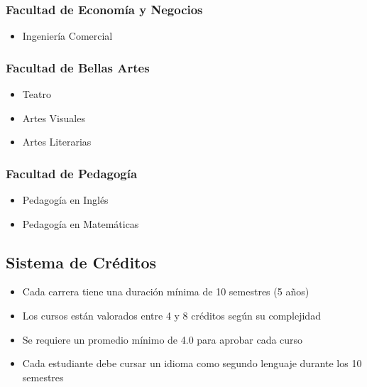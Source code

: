 \documentclass[12pt,a4paper]{article}
\begin{document}
	\subsubsection{Facultad de Economía y Negocios}
	\begin{itemize}
		\item Ingeniería Comercial
	\end{itemize}
	
	\subsubsection{Facultad de Bellas Artes}
	\begin{itemize}
		\item Teatro
		\item Artes Visuales
		\item Artes Literarias
	\end{itemize}
	
	\subsubsection{Facultad de Pedagogía}
	\begin{itemize}
		\item Pedagogía en Inglés
		\item Pedagogía en Matemáticas
	\end{itemize}
	
	\subsection{Sistema de Créditos}
	\begin{itemize}
		\item Cada carrera tiene una duración mínima de 10 semestres (5 años)
		\item Los cursos están valorados entre 4 y 8 créditos según su complejidad
		\item Se requiere un promedio mínimo de 4.0 para aprobar cada curso
		\item Cada estudiante debe cursar un idioma como segundo lenguaje durante los 10 semestres
	\end{itemize}
	
	\vspace{0.5cm}
	
\end{document}
